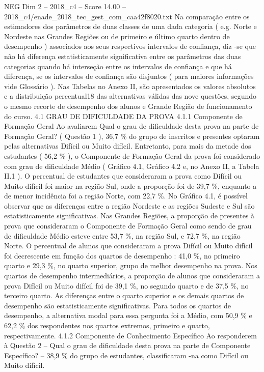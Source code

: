 \begin{textsample}{NEG Dim 2 – 2018\_c4 – Score 14.00 – 2018\_c4/enade\_2018\_tec\_gest\_com\_caa42f8020.txt}
Na comparação entre os estimadores dos parâmetros de duas classes de uma dada categoria ( e.g.
Norte e Nordeste nas Grandes Regiões ou de primeiro e último quarto dentro de desempenho ) associados aos seus respectivos intervalos de confiança, diz -se que não há diferença estatisticamente significativa entre os parâmetros das duas categorias quando há interseção entre os intervalos de confiança e que há diferença, se os intervalos de confiança são disjuntos ( para maiores informações vide Glossário ).
Nas Tabelas no Anexo II, são apresentados os valores absolutos e a distribuição percentual18 das alternativas válidas das nove questões, segundo o mesmo recorte de desempenho dos alunos e Grande Região de funcionamento do curso. 4.1 GRAU DE DIFICULDADE DA PROVA 4.1.1 Componente de Formação Geral Ao avaliarem Qual o grau de dificuldade desta prova na parte de Formação Geral? ( Questão 1 ), 36,7 \% do grupo de inscritos e presentes optaram pelas alternativas Difícil ou Muito difícil.
Entretanto, para mais da metade dos estudantes ( 56,2 \% ), o Componente de Formação Geral da prova foi considerado com grau de dificuldade Médio ( Gráfico 4.1, Gráfico 4.2 e, no Anexo II, a Tabela II.1 ).
O percentual de estudantes que consideraram a prova como Difícil ou Muito difícil foi maior na região Sul, onde a proporção foi de 39,7 \%, enquanto a de menor incidência foi a região Norte, com 22,7 \%.
No Gráfico 4.1, é possível observar que as diferenças entre a região Nordeste e as regiões Sudeste e Sul são estatisticamente significativas.
Nas Grandes Regiões, a proporção de presentes à prova que consideraram o Componente de Formação Geral como sendo de grau de dificuldade Médio esteve entre 53,7 \%, na região Sul, e 72,7 \%, na região Norte.
O percentual de alunos que consideraram a prova Difícil ou Muito difícil foi decrescente em função dos quartos de desempenho : 41,0 \%, no primeiro quarto e 29,3 \%, no quarto superior, grupo de melhor desempenho na prova.
Nos quartos de desempenho intermediários, a proporção de alunos que consideraram a prova Difícil ou Muito difícil foi de 39,1 \%, no segundo quarto e de 37,5 \%, no terceiro quarto.
As diferenças entre o quarto superior e os demais quartos de desempenho são estatisticamente significativas.
Para todos os quartos de desempenho, a alternativa modal para essa pergunta foi a Médio, com 50,9 \% e 62,2 \% dos respondentes nos quartos extremos, primeiro e quarto, respectivamente. 4.1.2 Componente de Conhecimento Específico Ao responderem à Questão 2 – Qual o grau de dificuldade desta prova na parte de Componente Específico? – 38,9 \% do grupo de estudantes, classificaram -na como Difícil ou Muito difícil.

\end{textsample}
